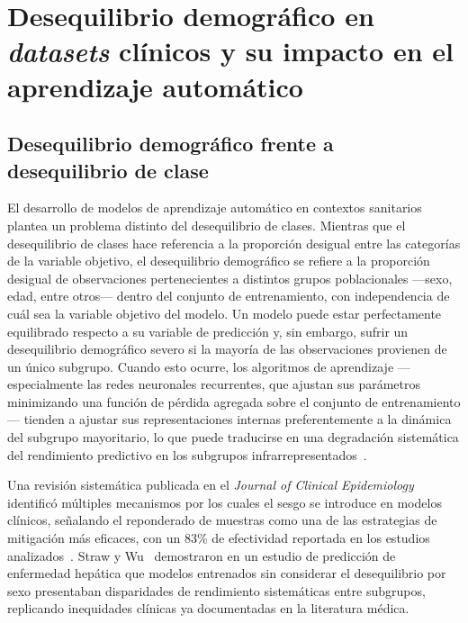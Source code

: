 \section{Desequilibrio demográfico en \emph{datasets} clínicos y su impacto en el aprendizaje automático}
\label{sec:desequilibrio_demografico_impacto_ml}

\subsection{Desequilibrio demográfico frente a desequilibrio de clase}
\label{subsec:desequilibrio_demografico_vs_clase}

El desarrollo de modelos de aprendizaje automático en contextos sanitarios plantea un problema distinto del desequilibrio de clases. Mientras que el desequilibrio de clases hace referencia a la proporción desigual entre las categorías de la variable objetivo, el desequilibrio demográfico se refiere a la proporción desigual de observaciones pertenecientes a distintos grupos poblacionales —sexo, edad, entre otros— dentro del conjunto de entrenamiento, con independencia de cuál sea la variable objetivo del modelo. Un modelo puede estar perfectamente equilibrado respecto a su variable de predicción y, sin embargo, sufrir un desequilibrio demográfico severo si la mayoría de las observaciones provienen de un único subgrupo. Cuando esto ocurre, los algoritmos de aprendizaje —especialmente las redes neuronales recurrentes, que ajustan sus parámetros minimizando una función de pérdida agregada sobre el conjunto de entrenamiento— tienden a ajustar sus representaciones internas preferentemente a la dinámica del subgrupo mayoritario, lo que puede traducirse en una degradación sistemática del rendimiento predictivo en los subgrupos infrarrepresentados~\cite{straw2022sexbias,ricci2024sociodemographic}.

Una revisión sistemática publicada en el \emph{Journal of Clinical Epidemiology} identificó múltiples mecanismos por los cuales el sesgo se introduce en modelos clínicos, señalando el reponderado de muestras como una de las estrategias de mitigación más eficaces, con un 83\% de efectividad reportada en los estudios analizados~\cite{ricci2024sociodemographic}. Straw y Wu~\cite{straw2022sexbias} demostraron en un estudio de predicción de enfermedad hepática que modelos entrenados sin considerar el desequilibrio por sexo presentaban disparidades de rendimiento sistemáticas entre subgrupos, replicando inequidades clínicas ya documentadas en la literatura médica.

